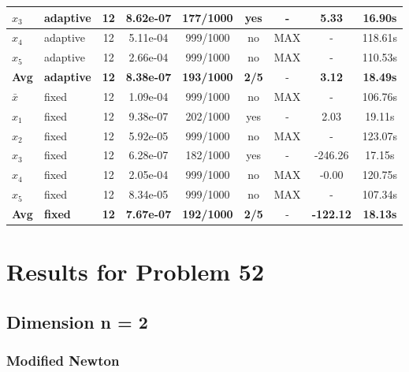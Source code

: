 \begin{longtable}{|l|l|c|c|c|c|c|c|c|}
\hline
$x_3$ & adaptive & 12 & 8.62e-07 & 177/1000 & yes & - & 5.33 & 16.90s \\
\hline
$x_4$ & adaptive & 12 & 5.11e-04 & 999/1000 & no & MAX & - & 118.61s \\
\hline
$x_5$ & adaptive & 12 & 2.66e-04 & 999/1000 & no & MAX & - & 110.53s \\
\hline
\hline\hline
\textbf{Avg} & \textbf{adaptive} & \textbf{12} & \textbf{8.38e-07} & \textbf{193/1000} & \textbf{2/5} & - & \textbf{3.12} & \textbf{18.49s} \\
\hline\hline
\hline
$\bar{x}$ & fixed & 12 & 1.09e-04 & 999/1000 & no & MAX & - & 106.76s \\
\hline
$x_1$ & fixed & 12 & 9.38e-07 & 202/1000 & yes & - & 2.03 & 19.11s \\
\hline
$x_2$ & fixed & 12 & 5.92e-05 & 999/1000 & no & MAX & - & 123.07s \\
\hline
$x_3$ & fixed & 12 & 6.28e-07 & 182/1000 & yes & - & -246.26 & 17.15s \\
\hline
$x_4$ & fixed & 12 & 2.05e-04 & 999/1000 & no & MAX & -0.00 & 120.75s \\
\hline
$x_5$ & fixed & 12 & 8.34e-05 & 999/1000 & no & MAX & - & 107.34s \\
\hline
\hline\hline
\textbf{Avg} & \textbf{fixed} & \textbf{12} & \textbf{7.67e-07} & \textbf{192/1000} & \textbf{2/5} & - & \textbf{-122.12} & \textbf{18.13s} \\
\hline\hline
\end{longtable}


\section{Results for Problem 52}

\subsection{Dimension n = 2}

\subsubsection{Modified Newton}


